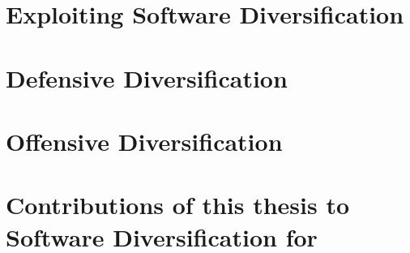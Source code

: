 \section{Exploiting Software Diversification}

\section{Defensive Diversification}

\section{Offensive Diversification}

\section{Contributions of this thesis to Software Diversification for \Wasm}

